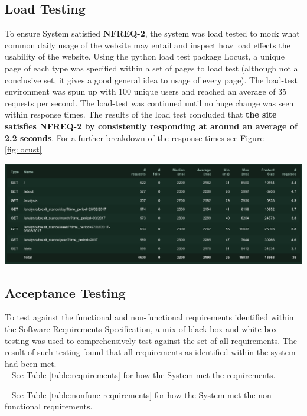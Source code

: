 \documentclass[11pt]{report}
\begin{document}
\clearpage
\subsection*{Load Testing}
To ensure System satisfied \textbf{NFREQ-2}, the system was load tested to mock what common daily usage of the website may entail and inspect how load effects the usability of the website. Using the python load test package Locust, a unique page of each type was specified within a set of pages to load test (although not a conclusive set, it gives a good general idea to usage of every page). The load-test environment was spun up with 100 unique users and reached an average of 35 requests per second. The load-test was continued until no huge change was seen within response times. The results of the load test concluded that \textbf{the site satisfies NFREQ-2 by consistently responding at around an average of 2.2 seconds}. For a further breakdown of the response times see Figure \ref{fig:locust}

\begin{center}
  \includegraphics[width=\textwidth]{images/load-test.png}
  \label{fig:locust}
\end{center}

\subsection*{Acceptance Testing}
To test against the functional and non-functional requirements identified within the Software Requirements Specification, a mix of black box and white box testing was used to comprehensively test against the set of all requirements. The result of such testing found that all requirements as identified within the system had been met. 
\\

-- See Table \ref{table:requirements} for how the System met the requirements.

-- See Table \ref{table:nonfunc-requirements} for how the System met the non-functional requirements.
\end{document}
